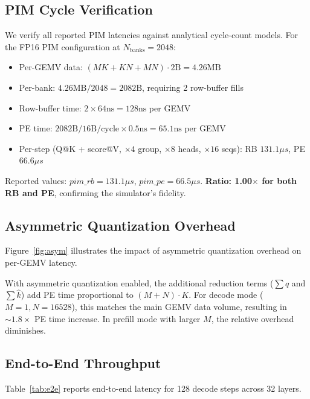 \subsection{PIM Cycle Verification}

We verify all reported PIM latencies against analytical cycle-count models.
For the FP16 PIM configuration at $N_{\text{banks}}\!=\!2048$:
\begin{itemize}
\item Per-GEMV data: $(MK + KN + MN) \cdot 2\text{B} = 4.26\text{MB}$
\item Per-bank: $4.26\text{MB} / 2048 = 2082\text{B}$, requiring 2 row-buffer fills
\item Row-buffer time: $2 \times 64\text{ns} = 128\text{ns}$ per GEMV
\item PE time: $2082\text{B} / 16\text{B/cycle} \times 0.5\text{ns} = 65.1\text{ns}$ per GEMV
\item Per-step (Q@K + score@V, $\times 4$ group, $\times 8$ heads, $\times 16$ seqs): RB $131.1\mu s$, PE $66.6\mu s$
\end{itemize}
Reported values: $pim\_rb = 131.1\mu s$, $pim\_pe = 66.5\mu s$.
\textbf{Ratio: 1.00$\times$ for both RB and PE}, confirming the simulator's fidelity.

\subsection{Asymmetric Quantization Overhead}

Figure~\ref{fig:asym} illustrates the impact of asymmetric quantization overhead on per-GEMV latency.

With asymmetric quantization enabled, the additional reduction terms ($\sum\hat{q}$ and $\sum\hat{k}$) add PE time proportional to $(M+N) \cdot K$.
For decode mode ($M=1, N=16528$), this matches the main GEMV data volume, resulting in $\sim\!1.8\times$ PE time increase.
In prefill mode with larger $M$, the relative overhead diminishes.

\subsection{End-to-End Throughput}

Table~\ref{tab:e2e} reports end-to-end latency for 128 decode steps across 32 layers.


